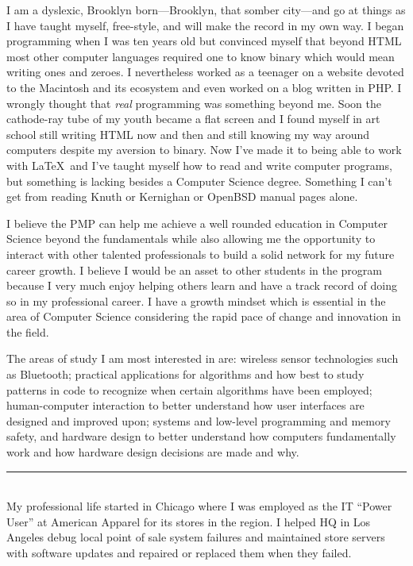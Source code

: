 \documentclass[12pt]{article}
\begin{document}
I am a dyslexic, Brooklyn born---Brooklyn, that somber city---and go at things as I have taught myself, free-style, and will make the record in my own way.
I began programming when I was ten years old but convinced myself that beyond HTML most other computer languages required one to know binary which would mean writing ones and zeroes. I nevertheless worked as a teenager on a website devoted to the Macintosh and its ecosystem and even worked on a blog written in PHP. I wrongly thought that \emph{real} programming was something beyond me. Soon the cathode-ray tube of my youth became a flat screen and I found myself in art school still writing HTML now and then and still knowing my way around computers despite my aversion to binary. Now I've made it to being able to work with \LaTeX\ and I've taught myself how to read and write computer programs, but something is lacking besides a Computer Science degree. Something I can't get from reading Knuth or Kernighan or OpenBSD manual pages alone.

I believe the PMP can help me achieve a well rounded education in Computer Science beyond the fundamentals while also allowing me the opportunity to interact with other talented professionals to build a solid network for my future career growth. I believe I would be an asset to other students in the program because I very much enjoy helping others learn and have a track record of doing so in my professional career. I have a growth mindset which is essential in the area of Computer Science considering the rapid pace of change and innovation in the field.

The areas of study I am most interested in are: wireless sensor technologies such as Bluetooth; practical applications for algorithms and how best to study patterns in code to recognize when certain algorithms have been employed; human-computer interaction to better understand how user interfaces are designed and improved upon; systems and low-level programming and memory safety, and hardware design to better understand how computers fundamentally work and how hardware design decisions are made and why.\\

\hrule\
\\

My professional life started in Chicago where I was employed as the IT ``Power User'' at American Apparel for its stores in the region. I helped HQ in Los Angeles debug local point of sale system failures and maintained store servers with software updates and repaired or replaced them when they failed.
\end{document}
